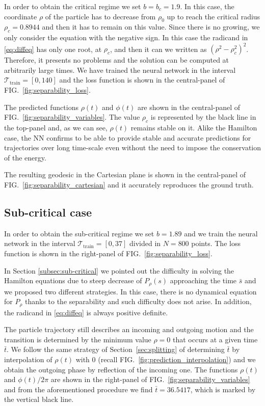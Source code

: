 \documentclass[prd,aps,a4paper,eqsecnum,nofootinbib,floatfix,twocolumn,superscriptaddress]{revtex4-2}
\begin{document}
In order to obtain the critical regime we set $b=b_c=1.9$.  In this case, the coordinate $\rho$ of the particle has to decrease from $\rho_0$ up to reach the critical radius $\rho_c=0.8944$ and then it has to remain on this value. Since there is no growing, we only consider the equation with the negative sign. In this case the radicand in \eqref{eq:diffeq} has only one root, at $\rho_c$, and then it can we written as $(\rho^2-\rho_c^2)^2$. Therefore, it presents no problems and the solution can be computed at arbitrarily large times.   We have trained the neural network in the interval $\mathcal{T}_\mathrm{train}=[0,140]$ and the loss function is shown in the central-panel of FIG.~\ref{fig:separability_loss}. 

The predicted functions $\rho(t)$ and $\phi(t)$ are shown in the central-panel of FIG.~\ref{fig:separability_variables}. The value $\rho_c$ is represented by the black line in the top-panel and, as we can see, $\rho(t)$ remains stable on it. Alike the Hamilton case, the NN confirms to be able to provide stable and accurate predictions for trajectories over long time-scale even without the need to impose the conservation of the energy.

The resulting geodesic in the Cartesian plane is shown in the central-panel of FIG.~\ref{fig:separability_cartesian} and it accurately reproduces the ground truth.

\subsection{\label{subsec:separability_subcritical} Sub-critical case}

In order to obtain the sub-critical regime we set $b=1.89$ and we train the neural network in the interval $\mathcal{T}_\mathrm{train}=[0,37]$ divided in $N=800$ points.  The loss function is shown in the right-panel of FIG.~\ref{fig:separability_loss}.

In Section \ref{subsec:sub-critical} we pointed out the difficulty in solving the Hamilton equations due to steep decrease of $P_\rho(s)$ approaching the time $\bar s$ and we proposed two different strategies. In this case, there is no dynamical equation for $P_\rho$ thanks to the separability and such difficulty does not arise. In addition, the radicand in \eqref{eq:diffeq} is always positive definite. 

The particle trajectory still describes an incoming and outgoing motion and the transition is determined by the minimum value $\rho=0$ that occurs at a given time $\bar t$. We follow the same strategy of Section~\ref{sec:splitting} of determining $\bar t$ by interpolation of $\rho(t)$ with $0$ (recall FIG.~\ref{fig:prediction_interpolation}) and we obtain the outgoing phase by reflection of the incoming one. The functions $\rho(t)$ and $\phi(t)/2\pi$ are shown in the right-panel of FIG.~\ref{fig:separability_variables} and from the aforementioned procedure we find $\bar{t}=36.5417$, which is marked by the vertical black line.
\end{document}
